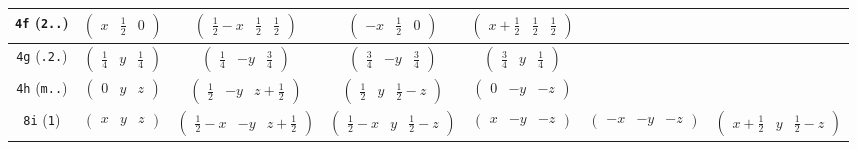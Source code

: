 \documentclass[fleqn,9pt,landscape]{jsarticle}
\begin{document}
\begin{center}
\begin{longtable}{ccccccc}
{\tt 4f} ({\tt 2..}) & $ \begin{pmatrix} x & \frac{1}{2} & 0 \end{pmatrix} $ & $ \begin{pmatrix} \frac{1}{2} - x & \frac{1}{2} & \frac{1}{2} \end{pmatrix} $ & $ \begin{pmatrix} - x & \frac{1}{2} & 0 \end{pmatrix} $ & $ \begin{pmatrix} x + \frac{1}{2} & \frac{1}{2} & \frac{1}{2} \end{pmatrix} $ & $  $ & $  $ \\ \hline
{\tt 4g} ({\tt .2.}) & $ \begin{pmatrix} \frac{1}{4} & y & \frac{1}{4} \end{pmatrix} $ & $ \begin{pmatrix} \frac{1}{4} & - y & \frac{3}{4} \end{pmatrix} $ & $ \begin{pmatrix} \frac{3}{4} & - y & \frac{3}{4} \end{pmatrix} $ & $ \begin{pmatrix} \frac{3}{4} & y & \frac{1}{4} \end{pmatrix} $ & $  $ & $  $ \\ \hline
{\tt 4h} ({\tt m..}) & $ \begin{pmatrix} 0 & y & z \end{pmatrix} $ & $ \begin{pmatrix} \frac{1}{2} & - y & z + \frac{1}{2} \end{pmatrix} $ & $ \begin{pmatrix} \frac{1}{2} & y & \frac{1}{2} - z \end{pmatrix} $ & $ \begin{pmatrix} 0 & - y & - z \end{pmatrix} $ & $  $ & $  $ \\ \hline
{\tt 8i} ({\tt 1}) & $ \begin{pmatrix} x & y & z \end{pmatrix} $ & $ \begin{pmatrix} \frac{1}{2} - x & - y & z + \frac{1}{2} \end{pmatrix} $ & $ \begin{pmatrix} \frac{1}{2} - x & y & \frac{1}{2} - z \end{pmatrix} $ & $ \begin{pmatrix} x & - y & - z \end{pmatrix} $ & $ \begin{pmatrix} - x & - y & - z \end{pmatrix} $ & $ \begin{pmatrix} x + \frac{1}{2} & y & \frac{1}{2} - z \end{pmatrix} $ \\

\end{longtable}
\end{center}
\end{document}
